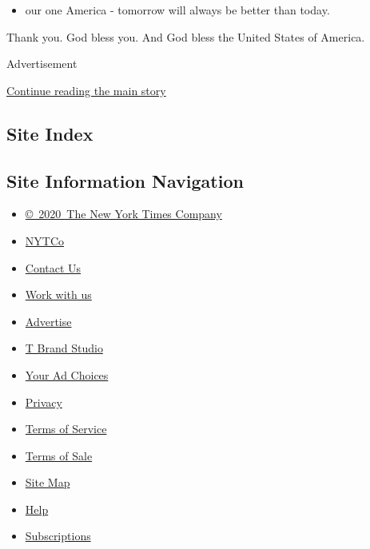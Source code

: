 \begin{itemize}
\tightlist
\item
  our one America - tomorrow will always be better than today.
\end{itemize}

Thank you. God bless you. And God bless the United States of America.

Advertisement

\protect\hyperlink{after-bottom}{Continue reading the main story}

\hypertarget{site-index}{%
\subsection{Site Index}\label{site-index}}

\hypertarget{site-information-navigation}{%
\subsection{Site Information
Navigation}\label{site-information-navigation}}

\begin{itemize}
\tightlist
\item
  \href{https://help.nytimes.com/hc/en-us/articles/115014792127-Copyright-notice}{©~2020~The
  New York Times Company}
\end{itemize}

\begin{itemize}
\tightlist
\item
  \href{https://www.nytco.com/}{NYTCo}
\item
  \href{https://help.nytimes.com/hc/en-us/articles/115015385887-Contact-Us}{Contact
  Us}
\item
  \href{https://www.nytco.com/careers/}{Work with us}
\item
  \href{https://nytmediakit.com/}{Advertise}
\item
  \href{http://www.tbrandstudio.com/}{T Brand Studio}
\item
  \href{https://www.nytimes.com/privacy/cookie-policy\#how-do-i-manage-trackers}{Your
  Ad Choices}
\item
  \href{https://www.nytimes.com/privacy}{Privacy}
\item
  \href{https://help.nytimes.com/hc/en-us/articles/115014893428-Terms-of-service}{Terms
  of Service}
\item
  \href{https://help.nytimes.com/hc/en-us/articles/115014893968-Terms-of-sale}{Terms
  of Sale}
\item
  \href{https://spiderbites.nytimes.com}{Site Map}
\item
  \href{https://help.nytimes.com/hc/en-us}{Help}
\item
  \href{https://www.nytimes.com/subscription?campaignId=37WXW}{Subscriptions}
\end{itemize}
